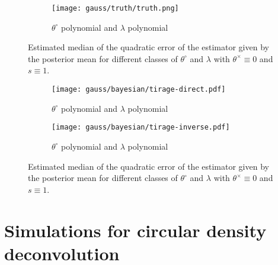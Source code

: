 \begin{figure}
\centering
\begin{subfigure}{.5\textwidth}
  \centering
  \texttt{[image: gauss/truth/truth.png]}
  \caption{$\theta^{\circ}$ polynomial and $\lambda$ polynomial}
  \label{fig3:sub1}
\end{subfigure}%
\caption{Estimated median of the quadratic error of the estimator given by the posterior mean for different classes of $\theta^{\circ}$ and $\lambda$ with $\theta^{\times} \equiv 0$ and $s \equiv 1$.}
\label{EQM}
\end{figure}


\begin{figure}
\centering
\begin{subfigure}{.5\textwidth}
  \centering
  \texttt{[image: gauss/bayesian/tirage-direct.pdf]}
  \caption{$\theta^{\circ}$ polynomial and $\lambda$ polynomial}
  \label{fig3:sub1}
\end{subfigure}%
\begin{subfigure}{.5\textwidth}
  \centering
  \texttt{[image: gauss/bayesian/tirage-inverse.pdf]}
  \caption{$\theta^{\circ}$ polynomial and $\lambda$ polynomial}
  \label{fig3:sub1}
\end{subfigure}%
\caption{Estimated median of the quadratic error of the estimator given by the posterior mean for different classes of $\theta^{\circ}$ and $\lambda$ with $\theta^{\times} \equiv 0$ and $s \equiv 1$.}
\label{EQM}
\end{figure}

\section{Simulations for circular density deconvolution}\label{D.2}

